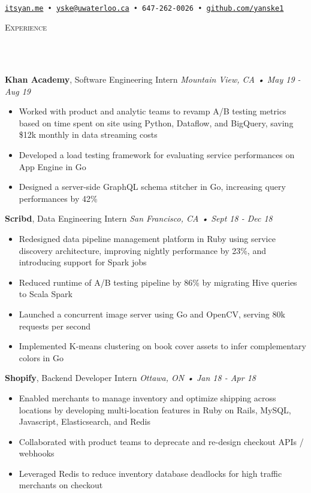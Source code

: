 \documentclass[a4paper, 11pt, hidelinks]{article}
\newcommand{\lineunder} {
    \vspace*{-8pt} \\
    \hrulefill \\
}
\newcommand{\header} [1] {
    \color{bigtext}
    {\hspace*{-4pt}\vspace*{6pt} \textsc{#1}}
    \vspace*{-6pt}
    \color{bodytext}
    \lineunder
    \vspace{6pt}
}
\newcommand{\jobheader} [4] {
    \color{bigtext}\textbf{#1}, #2 \color{weaktext}\hfill\textit{#3 • #4}\\
    \vspace{-1mm} \color{bodytext}
}
\begin{document}
\vspace*{-35pt}
\begin{center}
	\text{\fontsize{35}{40} \selectfont \color{bigtext}{Yan Ke}}\\
    \vspace{10pt}
    \color{weaktext}
    \texttt{\href{http://www.itsyan.me}{itsyan.me} •
    \href{mailto:yske@uwaterloo.ca}{yske@uwaterloo.ca} •
    647-262-0026 •
    \href{http://www.github.com/yanske1}{github.com/yanske1}}
\end{center}
\vspace{-2pt}

\header{Experience}
\jobheader{Khan Academy}{Software Engineering Intern}{Mountain View, CA}{May 19 - Aug 19}
\begin{itemize}[leftmargin=2em] \itemsep 1pt 
    \item Worked with product and analytic teams to revamp A/B testing metrics based on time spent on site
    using Python, Dataflow, and BigQuery, saving \$12k monthly in data streaming costs
    \item Developed a load testing framework for evaluating service performances on App Engine in Go
    \item Designed a server-side GraphQL schema stitcher in Go, increasing query performances by 42\%
\end{itemize}

\jobheader{Scribd}{Data Engineering Intern}{San Francisco, CA}{Sept 18 - Dec 18}
\begin{itemize}[leftmargin=2em] \itemsep 1pt \color{bodytext}
	\item Redesigned data pipeline management platform in Ruby using service discovery architecture,
    improving nightly performance by 23\%, and introducing support for Spark jobs
	\item Reduced runtime of A/B testing pipeline by 86\% by migrating Hive queries to Scala Spark
	\item Launched a concurrent image server using Go and OpenCV, serving 80k requests per second
	\item Implemented K-means clustering on book cover assets to infer complementary colors in Go
\end{itemize}

\jobheader{Shopify}{Backend Developer Intern}{Ottawa, ON}{Jan 18 - Apr 18}
\begin{itemize}[leftmargin=2em] \itemsep 1pt \color{bodytext}
	\item Enabled merchants to manage inventory and optimize shipping across locations by developing
    multi-location features in Ruby on Rails, MySQL, Javascript, Elasticsearch, and Redis
	\item Collaborated with product teams to deprecate and re-design checkout APIs / webhooks
	\item Leveraged Redis to reduce inventory database deadlocks for high traffic merchants on checkout
\end{itemize}
\end{document}
